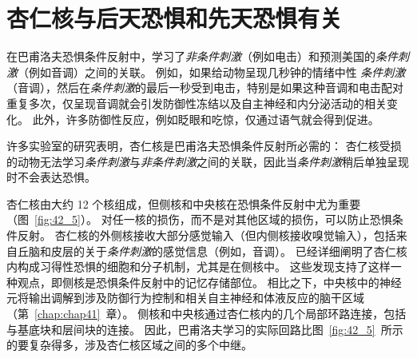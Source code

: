\section{杏仁核与后天恐惧和先天恐惧有关}

在巴甫洛夫恐惧条件反射中，学习了\textit{非条件刺激}（例如电击）和预测美国的\textit{条件刺激}（例如音调）之间的关联。
例如，如果给动物呈现几秒钟的情绪中性 \textit{条件刺激}（音调），然后在\textit{条件刺激}的最后一秒受到电击，特别是如果这种音调和电击配对重复多次，仅呈现音调就会引发防御性冻结以及自主神经和内分泌活动的相关变化。
此外，许多防御性反应，例如眨眼和吃惊，仅通过语气就会得到促进。


许多实验室的研究表明，杏仁核是巴甫洛夫恐惧条件反射所必需的：
杏仁核受损的动物无法学习\textit{条件刺激}与\textit{非条件刺激}之间的关联，因此当\textit{条件刺激}稍后单独呈现时不会表达恐惧。


杏仁核由大约 12 个核组成，但侧核和中央核在恐惧条件反射中尤为重要（图~\ref{fig:42_5}）。
对任一核的损伤，而不是对其他区域的损伤，可以防止恐惧条件反射。
杏仁核的外侧核接收大部分感觉输入（但内侧核接收嗅觉输入），包括来自丘脑和皮层的关于\textit{条件刺激}的感觉信息（例如，音调）。
已经详细阐明了杏仁核内构成习得性恐惧的细胞和分子机制，尤其是在侧核中。
这些发现支持了这样一种观点，即侧核是恐惧条件反射中的记忆存储部位。
相比之下，中央核中的神经元将输出调解到涉及防御行为控制和相关自主神经和体液反应的脑干区域（第~\ref{chap:chap41}~章）。
侧核和中央核通过杏仁核内的几个局部环路连接，包括与基底块和层间块的连接。
因此，巴甫洛夫学习的实际回路比图~\ref{fig:42_5}~所示的要复杂得多，涉及杏仁核区域之间的多个中继。


